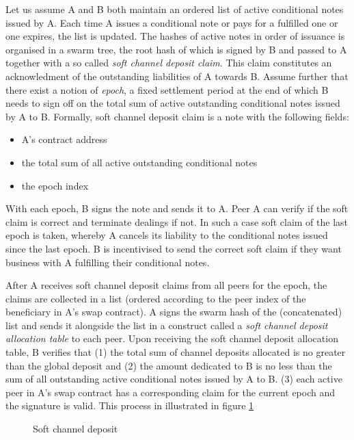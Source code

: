\documentclass[a4paper,10pt]{article}
\newcommand\gloss[1]{\emph{\gls{#1}}}
\begin{document}
Let us assume A and B both maintain an ordered list of active conditional notes issued by A.
Each time A issues a conditional note or pays for a fulfilled one or one expires, the list is updated.
The hashes of active notes in order of issuance is organised in a swarm tree, the
root hash of which is signed by B and passed to A together with a so called
\gloss{soft channel deposit claim}. This claim constitutes an acknowledment of
the outstanding liabilities of A towards B. Assume further that there exist a notion of \gloss{epoch},
a fixed settlement period at the end of which B needs to sign off on the total sum of active
outstanding conditional notes issued by A to B.
Formally, soft channel deposit claim is a note with the following fields:

\begin{itemize}
  \item A's contract address
  \item the total sum of all active outstanding conditional notes
  \item the epoch index
\end{itemize}

With each epoch, B signs the note and sends it to A.
Peer A can verify if the soft claim is correct and terminate dealings if not. In such a case soft claim of
the last epoch is taken, whereby A cancels its liability to the conditional notes issued since
the last epoch.
B is incentivised to send the correct soft claim if they want business with A fulfilling their
conditional notes.

After A receives soft channel deposit claims from all peers for the epoch, the claims are
collected in a list (ordered according to the peer index of the beneficiary in A's swap contract).
A signs the swarm hash of the (concatenated) list and sends it alongside the list
in a construct called a \gloss{soft channel deposit allocation table} to each peer.
Upon receiving the soft channel deposit allocation table, B verifies that
(1) the total sum of channel deposits allocated is no greater than the global deposit and
(2) the amount dedicated to B is no less than the sum of all outstanding active
conditional notes issued by A to B.
(3) each active peer in A's swap contract has a corresponding claim for the current epoch and the signature is valid.
This process in illustrated in figure \ref{fig:softchanneldeposit}


\begin{center}
\begin{figure}
\begin{center}
\begin{tikzpicture}
\end{tikzpicture}
\end{center}
\caption{Soft channel deposit}
\label{fig:softchanneldeposit}
\end{figure}
\end{center}
\end{document}
